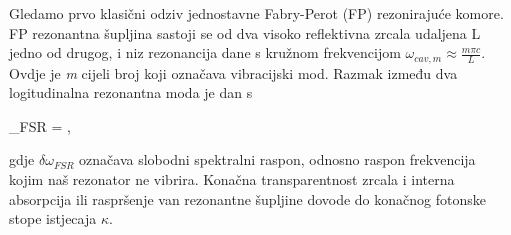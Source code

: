 Gledamo prvo klasični odziv jednostavne Fabry-Perot (FP) rezonirajuće komore. FP rezonantna šupljina sastoji se od dva visoko reflektivna
zrcala udaljena L jedno od drugog, i niz rezonancija dane s kružnom frekvencijom $\omega_{cav,m} \approx \frac{m\pi c}{L}$. Ovdje je \textit{m} cijeli broj koji označava
vibracijski mod. Razmak između dva logitudinalna rezonantna moda je dan s
\begin{eqation}
	\delta \omega_{FSR} = \pi {},
\end{eqation}
gdje $\delta \omega_{FSR}$ označava slobodni spektralni raspon, odnosno raspon frekvencija kojim naš rezonator ne vibrira. Konačna transparentnost zrcala i
interna absorpcija ili raspršenje van rezonantne šupljine dovode do konačnog fotonske stope istjecaja $\kappa$.


